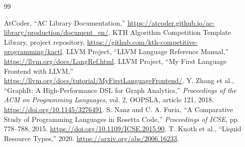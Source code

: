 \documentclass[12pt,a4paper]{report}
\begin{document}
\begin{thebibliography}{99}
 AtCoder, ``AC Library Documentation,'' \url{https://atcoder.github.io/ac-library/production/document_en/}.
 KTH Algorithm Competition Template Library, project repository, \url{https://github.com/kth-competitive-programming/kactl}.
 LLVM Project, ``LLVM Language Reference Manual,'' \url{https://llvm.org/docs/LangRef.html}.
 LLVM Project, ``My First Language Frontend with LLVM,'' \url{https://llvm.org/docs/tutorial/MyFirstLanguageFrontend/}.
 Y. Zhang et al., ``GraphIt: A High-Performance DSL for Graph Analytics,'' \emph{Proceedings of the ACM on Programming Languages}, vol. 2, OOPSLA, article 121, 2018. \url{https://doi.org/10.1145/3276491}.
 S. Nanz and C. A. Furia, ``A Comparative Study of Programming Languages in Rosetta Code,'' \emph{Proceedings of ICSE}, pp. 778--788, 2015. \url{https://doi.org/10.1109/ICSE.2015.90}.
 T. Knoth et al., ``Liquid Resource Types,'' 2020. \url{https://arxiv.org/abs/2006.16233}.
\end{thebibliography}
\end{document}

